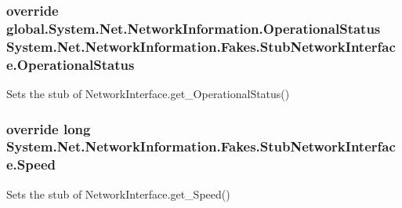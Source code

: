 \hypertarget{class_system_1_1_net_1_1_network_information_1_1_fakes_1_1_stub_network_interface_a589418adcf060da99be2156127e303a2}{
\subsubsection[{Operational\-Status}]{\setlength{\rightskip}{0pt plus 5cm}override global.\-System.\-Net.\-Network\-Information.\-Operational\-Status System.\-Net.\-Network\-Information.\-Fakes.\-Stub\-Network\-Interface.\-Operational\-Status\hspace{0.3cm}{\ttfamily [get]}}}\label{class_system_1_1_net_1_1_network_information_1_1_fakes_1_1_stub_network_interface_a589418adcf060da99be2156127e303a2}


Sets the stub of Network\-Interface.\-get\-\_\-\-Operational\-Status()

\hypertarget{class_system_1_1_net_1_1_network_information_1_1_fakes_1_1_stub_network_interface_af0d87a08013c438c3cf347c18ee03c0d}{
\subsubsection[{Speed}]{\setlength{\rightskip}{0pt plus 5cm}override long System.\-Net.\-Network\-Information.\-Fakes.\-Stub\-Network\-Interface.\-Speed\hspace{0.3cm}{\ttfamily [get]}}}\label{class_system_1_1_net_1_1_network_information_1_1_fakes_1_1_stub_network_interface_af0d87a08013c438c3cf347c18ee03c0d}


Sets the stub of Network\-Interface.\-get\-\_\-\-Speed()

